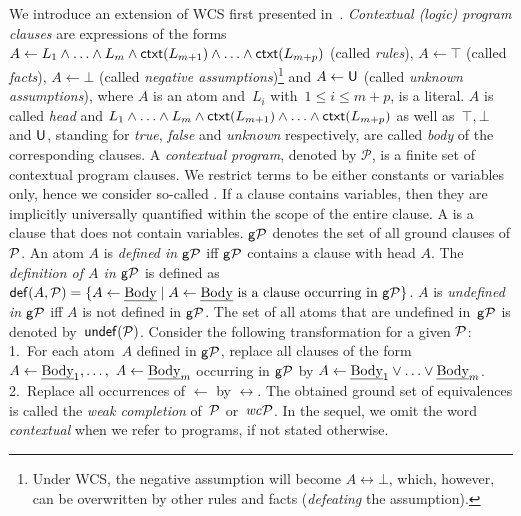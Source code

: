 \documentclass[12pt]{article}
\begin{document}
We introduce an extension of WCS first presented in~\cite{dietz:hoelldobler:pereira:2017}. 
\textit{Contextual (logic) program clauses}
are expressions of the forms $A  \leftarrow  L_1 \land \ldots \land L_m \land
\mathsf{ctxt}(L_{m+1}) \land \ldots \land \mathsf{ctxt}(L_{m+p})$ (called
\textit{rules}), $A \leftarrow \top$ (called \textit{facts}), $A \leftarrow \bot$ (called
\textit{negative assumptions})\footnote{Under WCS, the negative
assumption will become $A \leftrightarrow \bot$, which, however, can be overwritten by other rules and facts (\textit{defeating} the assumption).} and $A \leftarrow \mathsf{U}$ (called
\textit{unknown assumptions}), where
$A$ is an atom and~$L_i$ with~$1 \leq i \leq m+p$, is a literal.
$A$ is called \textit{head}
and $L_1 \land \ldots \land L_m \land
\mathsf{ctxt}(L_{m+1}) \land \ldots \land \mathsf{ctxt}(L_{m+p})$ as well as~$\top, \bot$
and $\mathsf{U}$,
standing for \textit{true}, \textit{false} and \textit{unknown} respectively, are
called \textit{body} of the corresponding clauses.  A
\textit{contextual program}, denoted by $\mathcal P$,
is a finite set of contextual program clauses.
We restrict terms to be either constants or variables only, hence we consider so-called .
If a clause contains variables, then they are implicitly universally quantified within the scope of the entire clause. 
A  is a clause that does not contain variables.
$\mathsf{g} {\cal P}$ denotes the set of all ground clauses of ${\cal P}$.
An atom $A$ is \textit{defined in $\mathsf{g} {\cal P}$}  iff $\mathsf{g} {\cal P}$ contains a clause with head $A$.
The \textit{definition of $A$ in $\mathsf{g} {\cal P}$} is defined as $\mathsf{def}(A,{\cal P})
= \{ A \leftarrow \mbox{\em Body} \mid A \leftarrow \mbox{\em Body} \mbox{ is a clause
occurring in } \mathsf{g} {\cal P}\}$.
$A$ is \textit{undefined in $\mathsf{g} {\cal P}$} iff $A$ is not defined in $\mathsf{g} {\cal P}$.
The set of all atoms that are undefined in~$\mathsf{g} {\cal P}$ is denoted by~$\mathsf{undef}({\cal P})$.
Consider the following transformation for a given ${\cal P}$:
1.\ For each atom~$A$ defined in $\mathsf{g} {\cal P}$, replace
  all clauses of the form $A \leftarrow \mbox{\em Body}_1, \ldots,$ $A \leftarrow
  \mbox{\em Body}_m$ occurring in $\mathsf{g} {\cal P}$ by $ A \leftarrow \mbox{\em Body}_1 \vee
  \ldots \vee \mbox{\em Body}_m$. 2.\ Replace all occurrences of $\leftarrow$ by $\leftrightarrow$.
The obtained ground set of equivalences is called the \textit{weak completion}
of~${\cal P}$ or~$\mathit{wc}{\cal P}$.
In the sequel, we omit the word \textit{contextual} when we refer to programs, if not stated otherwise.
\end{document}
